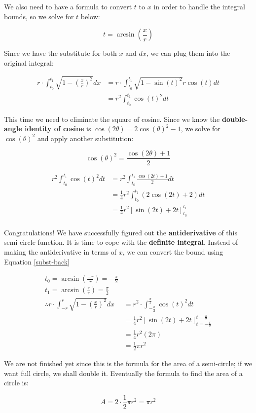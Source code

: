 We also need to have a formula to convert $t$ to $x$ in order to handle the
integral bounds, so we solve for $t$ below:

\begin{equation}
	t=\arcsin(\frac{x}r)
	\label{subst-back}
\end{equation}

Since we have the substitute for both $x$ and $dx$, we can plug them into the
original integral:

$$
\begin{aligned}
	r\cdot\int_{t_0}^{t_1}\sqrt{1-(\frac{x}r)^2}dx
	&=r\cdot\int_{t_0}^{t_1}\sqrt{1-\sin(t)^2}r\cos(t)dt \\
	&=r^2\int_{t_0}^{t_1}\cos(t)^2dt
\end{aligned}
$$

This time we need to eliminate the square of cosine. Since we know the
\textbf{double-angle identity of cosine} is $\cos(2\theta)=2\cos(\theta)^2-1$,
we solve for $\cos(\theta)^2$ and apply another substitution:

$$\cos(\theta)^2=\frac{\cos(2\theta)+1}2$$

$$
\begin{aligned}
	r^2\int_{t_0}^{t_1}\cos(t)^2dt
	&=r^2\int_{t_0}^{t_1}\frac{\cos(2t)+1}2dt \\
	&=\frac{1}4r^2\int_{t_0}^{t_1}(2\cos(2t)+2)dt \\
	&=\frac{1}4r^2\left[\sin(2t)+2t\right]^{t_1}_{t_0} \\
\end{aligned}
$$

Congratulations! We have successfully figured out the \textbf{antiderivative}
of this semi-circle function. It is time to cope with the \textbf{definite
integral}. Instead of making the antiderivative in terms of $x$, we can
convert the bound using Equation \ref{subst-back}

$$
\begin{aligned}
	t_0=\arcsin(\frac{-r}r)=-\frac{\pi}2 \\
	t_1=\arcsin(\frac{r}r)=\frac{\pi}2 \\
	\therefore r\cdot\int_{-r}^{r}\sqrt{1-(\frac{x}r)^2}dx
	&=r^2\cdot\int_{-\frac{\pi}2}^{\frac{\pi}2}\cos(t)^2dt \\
	&=\frac{1}4r^2\left[\sin(2t)+2t\right]^{t=\frac{\pi}2}
	_{t=-\frac{\pi}2} \\
	&=\frac{1}4r^2(2\pi) \\
	&=\frac{1}2\pi r^2
\end{aligned}
$$

We are not finished yet since this is the formula for the area of a
semi-circle; if we want full circle, we shall double it. Eventually the
formula to find the area of a circle is:

$$A=2\cdot\frac{1}2\pi r^2=\pi r^2$$
